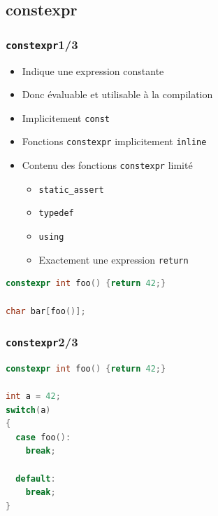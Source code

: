 \documentclass[C++.tex]{subfiles}
\begin{document}
\subsection*{constexpr}
\begin{frame}[fragile]
	\frametitle{\lstinline|constexpr|\titlehfill{}1/3}
	\begin{itemize}
		\item Indique une expression constante
		\item Donc évaluable et utilisable à la compilation
		\item Implicitement \lstinline|const|
		\item Fonctions \lstinline|constexpr| implicitement \lstinline|inline|
		\item Contenu des fonctions \lstinline|constexpr| limité
		\begin{itemize}
			\item \lstinline|static_assert|
			\item \lstinline|typedef|
			\item \lstinline|using|
			\item Exactement une expression \lstinline|return|
		\end{itemize}

	\end{itemize}

	\begin{lstlisting}[language=C++]
constexpr int foo() {return 42;}

char bar[foo()];\end{lstlisting}
\end{frame}

\begin{frame}[fragile]
	\frametitle{\lstinline|constexpr|\titlehfill{}2/3}
	\begin{lstlisting}[language=C++]
constexpr int foo() {return 42;}

int a = 42;
switch(a)
{
  case foo():
    break;

  default:
    break;
}\end{lstlisting}
\end{frame}
\end{document}
